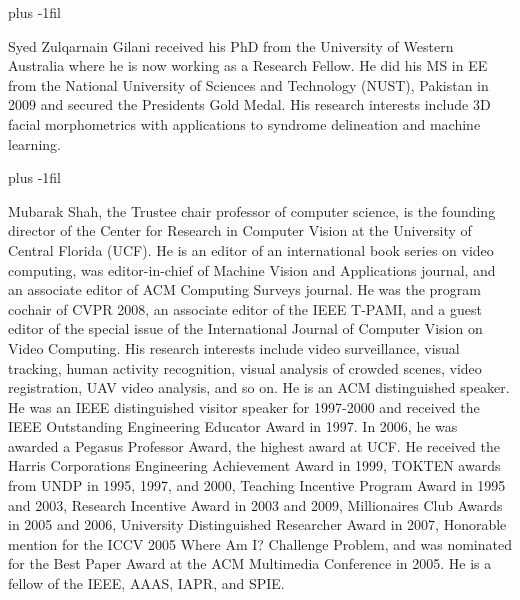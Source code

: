 \documentclass[10pt,journal,compsoc]{IEEEtran}
\begin{document}
\vskip 0pt plus -1fil
\vspace{-3mm}
\begin{IEEEbiography}
{Syed Zulqarnain Gilani} received his PhD from the University of Western Australia where he is now working as a Research Fellow. He did his MS in EE from the National University of Sciences and Technology (NUST), Pakistan in 2009 and secured the Presidents Gold Medal. His research interests include 3D facial morphometrics with applications to syndrome delineation  and machine learning.
\end{IEEEbiography}
\vskip 0pt plus -1fil
\vspace{-3mm}
\begin{IEEEbiography}
{Mubarak Shah}, the Trustee chair professor of computer science, is the founding
director of the Center for Research in Computer Vision at the University of Central Florida (UCF).
He is an editor of an international book series on video computing, was editor-in-chief of Machine
Vision and Applications journal, and an associate editor of ACM Computing Surveys journal. He was the program cochair of CVPR 2008, an associate editor of the IEEE T-PAMI, and a guest editor of the special issue of the International Journal of Computer Vision on Video Computing. His research interests include video surveillance, visual tracking, human activity recognition, visual analysis of crowded scenes, video registration, UAV video analysis, and so on. He is an ACM distinguished speaker. He was an IEEE distinguished visitor speaker for 1997-2000 and received the IEEE Outstanding Engineering Educator Award in 1997. In 2006, he was awarded a Pegasus Professor Award, the highest award at UCF. He received the Harris Corporations Engineering Achievement Award in 1999, TOKTEN awards from UNDP in 1995, 1997, and 2000, Teaching Incentive Program Award in 1995 and 2003, Research Incentive Award in 2003 and 2009, Millionaires Club Awards in 2005 and 2006, University Distinguished Researcher Award in 2007, Honorable mention for the ICCV 2005 Where Am I? Challenge Problem, and was nominated for the Best Paper Award at the ACM Multimedia Conference in 2005. He is a fellow of the IEEE, AAAS, IAPR, and SPIE. 

\end{IEEEbiography}

\end{document}
